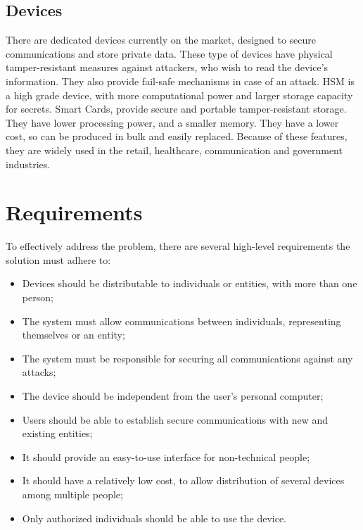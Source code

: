 \subsection{Devices}\label{chap:problem:devices}

There are dedicated devices currently on the market, designed to secure communications and store private data.
These type of devices have physical tamper-resistant measures against attackers, who wish to read the device's information. They also provide fail-safe mechanisms in case of an attack.
\ac{HSM} is a high grade device, with more computational power and larger storage capacity for secrets.
Smart Cards, provide secure and portable tamper-resistant storage. They have lower processing power, and a smaller memory. They have a lower cost, so can be produced in bulk and easily replaced.
Because of these features, they are widely used in the retail, healthcare, communication and government industries.

\section{Requirements}\label{chap:problem:requirements}

To effectively address the problem, there are several high-level requirements the solution must adhere to:
\begin{itemize}
	\item Devices should be distributable to individuals or entities, with more than one person;
	\item The system must allow communications between individuals, representing themselves or an entity;
	\item The system must be responsible for securing all communications against any attacks;
	\item The device should be independent from the user's personal computer;
	\item Users should be able to establish secure communications with new and existing entities;
	\item It should provide an easy-to-use interface for non-technical people;
	\item It should have a relatively low cost, to allow distribution of several devices among multiple people;
	\item Only authorized individuals should be able to use the device.
\end{itemize}

